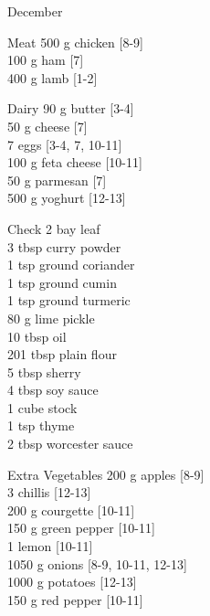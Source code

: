 \begin{menu}{December}
      \begin{shoppinglist}{Meat}
      500 g chicken {\scriptsize[8-9]}\\
      100 g ham {\scriptsize[7]}\\
      400 g lamb {\scriptsize[1-2]}\\
      \end{shoppinglist}%
      \begin{shoppinglist}{Dairy}
      90 g butter {\scriptsize[3-4]}\\
      50 g cheese {\scriptsize[7]}\\
      7  eggs {\scriptsize[3-4, 7, 10-11]}\\
      100 g feta cheese {\scriptsize[10-11]}\\
      50 g parmesan {\scriptsize[7]}\\
      500 g yoghurt {\scriptsize[12-13]}\\
      \end{shoppinglist}%
      \par\vfil %
      \vfil\clearpage %
      \begin{shoppinglist}{Check}
      2  bay leaf \\
      3 tbsp curry powder \\
      1 tsp ground coriander \\
      1 tsp ground cumin \\
      1 tsp ground turmeric \\
      80 g lime pickle \\
      10 tbsp oil \\
      201 tbsp plain flour \\
      5 tbsp sherry \\
      4 tbsp soy sauce \\
      1 cube stock \\
      1 tsp thyme \\
      2 tbsp worcester sauce \\
      \end{shoppinglist}%
      \begin{shoppinglist}{Extra Vegetables}
      200 g apples {\scriptsize[8-9]}\\
      3  chillis {\scriptsize[12-13]}\\
      200 g courgette {\scriptsize[10-11]}\\
      150 g green pepper {\scriptsize[10-11]}\\
      1  lemon {\scriptsize[10-11]}\\
      1050 g onions {\scriptsize[8-9, 10-11, 12-13]}\\
      1000 g potatoes {\scriptsize[12-13]}\\
      150 g red pepper {\scriptsize[10-11]}\\
      \end{shoppinglist}%
      \par\vfil %
    \vfil\clearpage
  

\end{menu}
